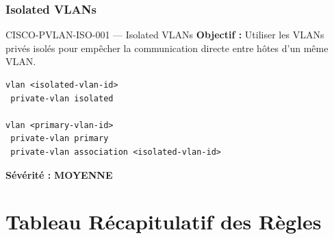 \documentclass[12pt, a4paper]{report}
\begin{document}
\subsection{Isolated VLANs}

\begin{rulebox}{CISCO-PVLAN-ISO-001 — Isolated VLANs}
  \textbf{Objectif :} Utiliser les VLANs privés isolés pour empêcher la communication directe entre hôtes d'un même VLAN.

  \begin{lstlisting}
vlan <isolated-vlan-id>
 private-vlan isolated

vlan <primary-vlan-id>
 private-vlan primary
 private-vlan association <isolated-vlan-id>
  \end{lstlisting}

  \textbf{Sévérité :} \textcolor{accentGreen}{\textbf{MOYENNE}}
\end{rulebox}

\chapter{Tableau Récapitulatif des Règles}
\end{document}
